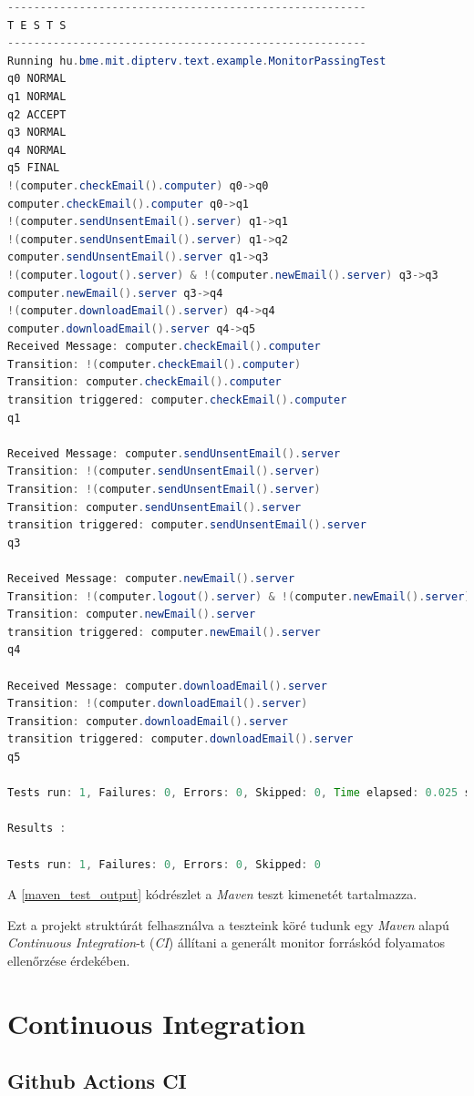 \begin{lstlisting}[language=java, frame=single, float=ht!, caption={Integrációs teszteset eredménye.},captionpos=b,label=maven_test_output]
-------------------------------------------------------
T E S T S
-------------------------------------------------------
Running hu.bme.mit.dipterv.text.example.MonitorPassingTest
q0 NORMAL
q1 NORMAL
q2 ACCEPT
q3 NORMAL
q4 NORMAL
q5 FINAL
!(computer.checkEmail().computer) q0->q0
computer.checkEmail().computer q0->q1
!(computer.sendUnsentEmail().server) q1->q1
!(computer.sendUnsentEmail().server) q1->q2
computer.sendUnsentEmail().server q1->q3
!(computer.logout().server) & !(computer.newEmail().server) q3->q3
computer.newEmail().server q3->q4
!(computer.downloadEmail().server) q4->q4
computer.downloadEmail().server q4->q5
Received Message: computer.checkEmail().computer
Transition: !(computer.checkEmail().computer)
Transition: computer.checkEmail().computer
transition triggered: computer.checkEmail().computer
q1

Received Message: computer.sendUnsentEmail().server
Transition: !(computer.sendUnsentEmail().server)
Transition: !(computer.sendUnsentEmail().server)
Transition: computer.sendUnsentEmail().server
transition triggered: computer.sendUnsentEmail().server
q3

Received Message: computer.newEmail().server
Transition: !(computer.logout().server) & !(computer.newEmail().server)
Transition: computer.newEmail().server
transition triggered: computer.newEmail().server
q4

Received Message: computer.downloadEmail().server
Transition: !(computer.downloadEmail().server)
Transition: computer.downloadEmail().server
transition triggered: computer.downloadEmail().server
q5

Tests run: 1, Failures: 0, Errors: 0, Skipped: 0, Time elapsed: 0.025 sec

Results :

Tests run: 1, Failures: 0, Errors: 0, Skipped: 0
\end{lstlisting}

A \ref{maven_test_output} kódrészlet a \textit{Maven} teszt kimenetét tartalmazza.

Ezt a projekt struktúrát felhasználva a teszteink köré tudunk egy \textit{Maven} alapú \textit{Continuous Integration}-t (\textit{CI}) állítani a generált monitor forráskód folyamatos ellenőrzése érdekében.

\clearpage\section{Continuous Integration}\subsection{Github Actions CI}

